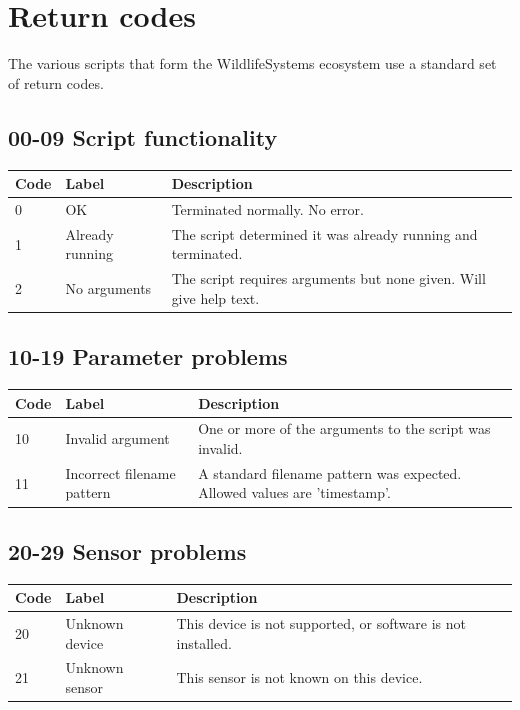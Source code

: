 \documentclass[
]{book}
\begin{document}
\appendix


\chapter{Return codes}\label{return-codes}

The various scripts that form the WildlifeSystems ecosystem use a standard set of return codes.

\section{00-09 Script functionality}\label{script-functionality}

\begin{tabular}{l|l|l}
\hline
Code & Label & Description\\
\hline
0 & OK & Terminated normally. No error.\\
\hline
1 & Already running & The script determined it was already running and terminated.\\
\hline
2 & No arguments & The script requires arguments but none given. Will give help text.\\
\hline
\end{tabular}

\section{10-19 Parameter problems}\label{parameter-problems}

\begin{tabular}{l|l|l}
\hline
Code & Label & Description\\
\hline
10 & Invalid argument & One or more of the arguments to the script was invalid.\\
\hline
11 & Incorrect filename pattern & A standard filename pattern was expected. Allowed values are 'timestamp'.\\
\hline
\end{tabular}

\section{20-29 Sensor problems}\label{sensor-problems}

\begin{tabular}{l|l|l}
\hline
Code & Label & Description\\
\hline
20 & Unknown device & This device is not supported, or software is not installed.\\
\hline
21 & Unknown sensor & This sensor is not known on this device.\\
\hline
\end{tabular}
\end{document}
